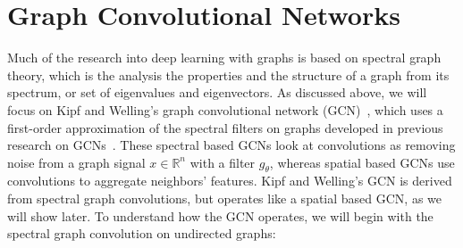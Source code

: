 
\section{Graph Convolutional Networks}
Much of the research into deep learning with graphs is based on spectral graph theory, which is the analysis the properties and the structure of a graph from its spectrum, or set of eigenvalues and eigenvectors. As discussed above, we will focus on Kipf and Welling's graph convolutional network (GCN)~\cite{Kipf2016}, which uses a first-order approximation of the spectral filters on graphs developed in previous research on GCNs~\cite{Bruna2013}. These spectral based GCNs look at convolutions as removing noise from a graph signal $x \in \mathbb{R}^n$ with a filter $g_\theta$, whereas spatial based GCNs use convolutions to aggregate neighbors' features. Kipf and Welling's GCN is derived from spectral graph convolutions, but operates like a spatial based GCN, as we will show later. To understand how the GCN operates, we will begin with the spectral graph convolution on undirected graphs:

